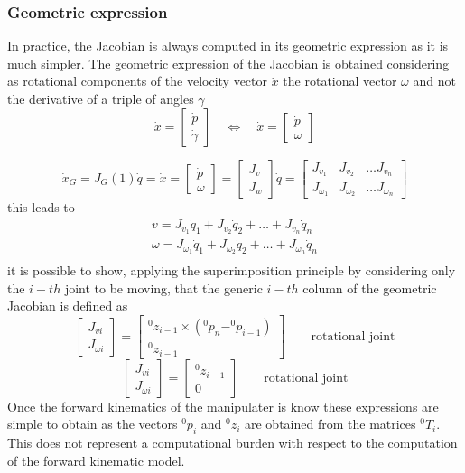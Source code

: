 \documentclass{book}
\begin{document}
\subsubsection{Geometric expression}
In practice, the Jacobian is always computed in its geometric expression as it is much simpler. The geometric expression of the Jacobian is obtained considering as rotational components of the velocity vector $\dot{x}$ the rotational vector $\omega$ and not the derivative of a triple of angles $\gamma$
\[
    \dot{x}=\begin{bmatrix} \dot{p} \\ \dot {\gamma} \end{bmatrix} \quad \iff \quad \dot{x}=\begin{bmatrix} \dot{p} \\ \omega \end{bmatrix}
\]

\[
    \dot{x}_G=J_G(1)\dot{q}=\dot{x}=\begin{bmatrix} \dot{p} \\ \omega \end{bmatrix} = \begin{bmatrix} J_v \\ J_w \end{bmatrix} \dot{q}=\begin{bmatrix}
    J_{v_1} & J_{v_2} & \dots J_{v_n}\\ 
    J_{\omega_1} & J_{\omega_2} & \dots J_{\omega_n} 
\end{bmatrix}
\]
this leads to 
\begin{gather*}
    v= J_{v_1}\dot{q}_1 + J_{v_2}\dot{q}_2 + \dots + J_{v_n} \dot{q}_n \\
    \omega= J_{\omega_1}\dot{q}_1 + J_{\omega_2}\dot{q}_2 + \dots + J_{\omega_n} \dot{q}_n \\
\end{gather*}
it is possible to show, applying the superimposition principle by considering only the $i-th$ joint to be moving, that the generic $i-th$ column of the geometric Jacobian is defined as
\[
    \begin{bmatrix} J_{vi} \\ J_{\omega i} \end{bmatrix} = \begin{bmatrix}
    ^0z_{i-1} \times (^0p_n-^0p_{i-1}) \\
    ^0z_{i-1}
\end{bmatrix} \qquad \text{rotational joint}
\]
\[
    \begin{bmatrix} J_{vi} \\ J_{\omega i} \end{bmatrix} = \begin{bmatrix}
    ^0z_{i-1}\\
    0
\end{bmatrix} \qquad \text{rotational joint}
\]
Once the forward kinematics of the manipulater is know these expressions are simple to obtain as the vectors $^0p_i$ and $^0z_i$ are obtained from the matrices $^0T_i$. This does not represent a computational burden with respect to the computation of the forward kinematic model.
\end{document}
